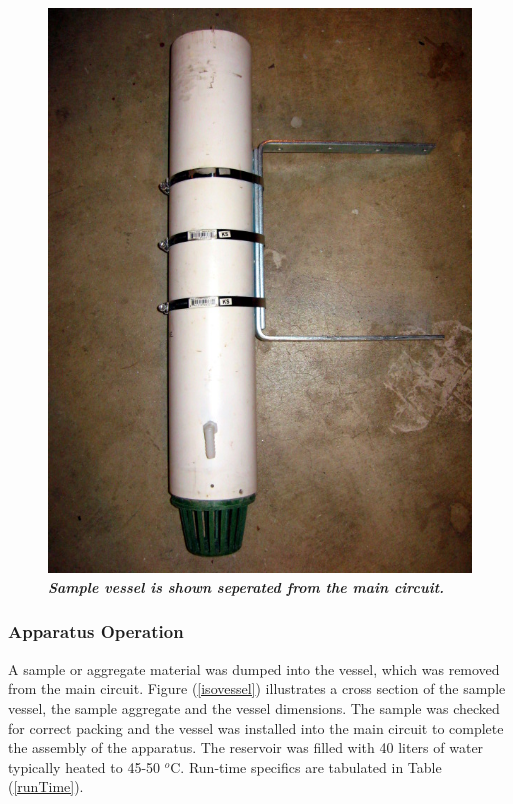 \begin{figure}
\centering\includegraphics[scale=1.25]{vesselPhoto.jpg}
\caption[Sample Vessel]{\textbf{\emph{Sample vessel is shown seperated from the main circuit.}}\label{vesselPhoto}}
\end{figure}

\subsubsection{Apparatus Operation}
A sample or aggregate material was dumped into the vessel, which was removed from the main circuit. Figure (\ref{isovessel}) illustrates a cross section of the sample vessel, the sample aggregate and the vessel dimensions. The sample was checked for correct packing and the vessel was installed into the main circuit to complete the assembly of the apparatus. The reservoir was filled with 40 liters of water typically heated to 45-50 $^{o}$C. Run-time specifics are tabulated in Table (\ref{runTime}).

